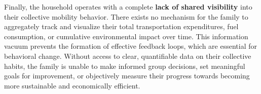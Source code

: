 \textgap

Finally, the household operates with a complete \textbf{lack of shared visibility} into their collective mobility behavior. There exists no mechanism for the family to aggregately track and visualize their total transportation expenditures, fuel consumption, or cumulative environmental impact over time. This information vacuum prevents the formation of effective feedback loops, which are essential for behavioral change. Without access to clear, quantifiable data on their collective habits, the family is unable to make informed group decisions, set meaningful goals for improvement, or objectively measure their progress towards becoming more sustainable and economically efficient.

